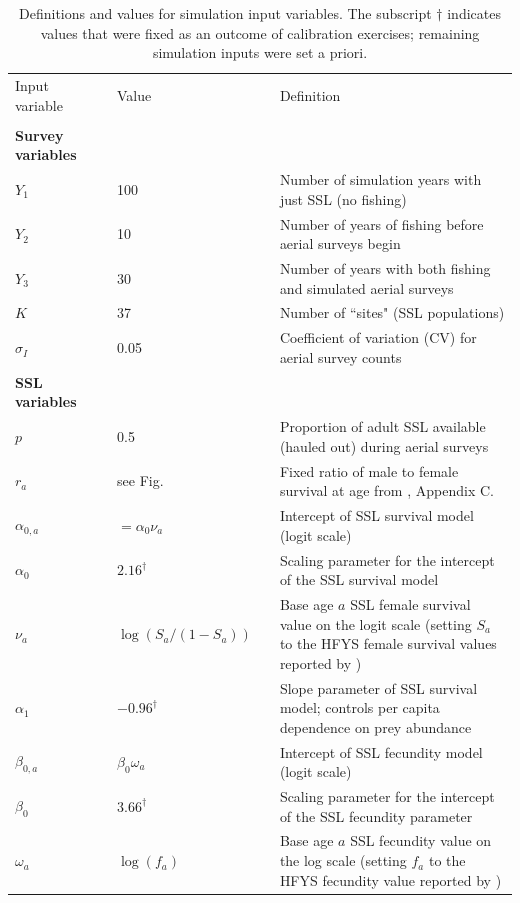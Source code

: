 \documentclass[nonumbib,leqno]{nrc1}
\begin{document}
\begin{table}
\caption{ \large Definitions and values for simulation input variables.  The subscript $\dag$
indicates values that were fixed as an outcome of calibration exercises; remaining simulation inputs were
set a priori.}
\label{tab:inputs}
\begin{tabular}{p{3cm}lll p{9cm}}
\\
\hline \hline
Input variable & & Value & & Definition\\
\cline{1-1} \cline{3-3} \cline{5-5}
\\
\multicolumn{1}{l}{\textbf{Survey variables}}  \\
$Y_1$ & & 100 & & Number of simulation years with just SSL (no fishing) \\
$Y_2$ & & 10 & & Number of years of fishing before aerial surveys begin \\
$Y_3$ & & 30 & & Number of years with both fishing and simulated aerial surveys \\
$K$ & & 37 & & Number of ``sites" (SSL populations)  \\
$\sigma_I$ & & 0.05 & & Coefficient of variation (CV) for aerial survey counts \\
\midrule
\multicolumn{1}{l}{\textbf{SSL variables}}  \\
$p$ & & 0.5 & & Proportion of adult SSL available (hauled out) during aerial surveys \\
$r_a$ & & see Fig. & & Fixed ratio
of male to female survival at age from \citet{HolmesEtAl2007}, Appendix C. \\
$\alpha_{0,a}$ & & $=\alpha_0 \nu_a $ & & Intercept of SSL survival model (logit scale) \\
$\alpha_0$ & & $2.16^\dag$ & & Scaling parameter for the intercept of the SSL survival model \\
$\nu_a $ & & $\log(S_a/(1-S_a))$ & & Base age $a$ SSL female survival value on the logit scale (setting $S_a$ to the HFYS female survival values reported by \citet{HolmesEtAl2007})  \\
$\alpha_1$ & & $-0.96^\dag$ & & Slope parameter of SSL survival model; controls per capita dependence on prey abundance \\
$\beta_{0,a}$ & & $\beta_0 \omega_a$ & & Intercept of SSL fecundity model (logit scale) \\
$\beta_0$ & & $3.66^\dag$ & & Scaling parameter for the intercept of the SSL fecundity parameter \\
$\omega_a$ & & $\log(f_a)$ & & Base age $a$ SSL fecundity value on the log scale (setting $f_a$ to the HFYS fecundity value reported by \citet{HolmesEtAl2007}) \\

\end{tabular}
\end{table}
\end{document}
